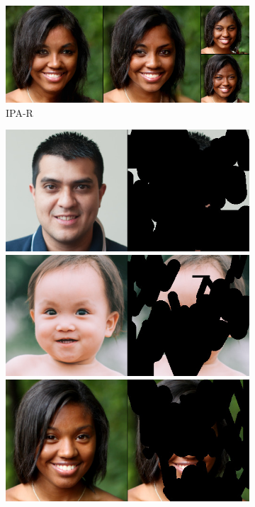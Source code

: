 \begin{figure}[t]
\begin{subfigure}[t]{0.25\textwidth}
      \includegraphics[height=\ffhqimgheight]{figs/cigcvae/image-samples/ffhq256/freeform_aipo-r_32_samples.jpg}
      \caption{\scriptsize IPA-R}
    \end{subfigure}
    \begin{subfigure}[t]{0.22\textwidth}
      \centering
      \includegraphics[height=\ffhqimgheight]{figs/cigcvae/image-samples/ffhq256/freeform_aipo_0_gt_masked.jpg}
      \includegraphics[height=\ffhqimgheight]{figs/cigcvae/image-samples/ffhq256/freeform_aipo_13_gt_masked.jpg}
      \includegraphics[height=\ffhqimgheight]{figs/cigcvae/image-samples/ffhq256/freeform_aipo_32_gt_masked.jpg}

\end{subfigure}
\end{figure}
